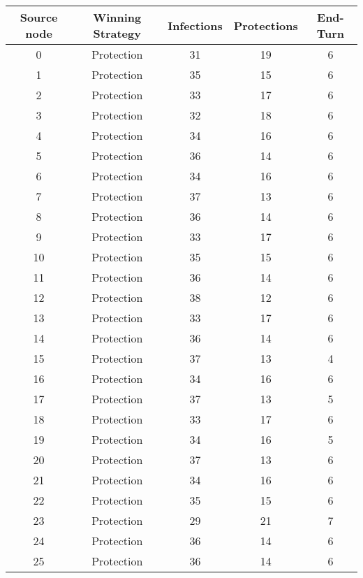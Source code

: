 \documentclass[results.tex]{subfiles}
\begin{document}
\begin{center}
  \begin{tabular}{| c || c | c | c | c |}
    \hline
    {\bfseries Source node} & {\bfseries Winning Strategy} & {\bfseries Infections} & {\bfseries Protections} & {\bfseries End-Turn} \\  %
    \hline\hline
    0 & Protection & 31 & 19 & 6 \\ 
    \hline
    1 & Protection & 35 & 15 & 6 \\ 
    \hline
    2 & Protection & 33 & 17 & 6 \\ 
    \hline
    3 & Protection & 32 & 18 & 6 \\ 
    \hline
    4 & Protection & 34 & 16 & 6 \\ 
    \hline
    5 & Protection & 36 & 14 & 6 \\ 
    \hline
    6 & Protection & 34 & 16 & 6 \\ 
    \hline
    7 & Protection & 37 & 13 & 6 \\ 
    \hline
    8 & Protection & 36 & 14 & 6 \\ 
    \hline
    9 & Protection & 33 & 17 & 6 \\ 
    \hline
    10 & Protection & 35 & 15 & 6 \\ 
    \hline
    11 & Protection & 36 & 14 & 6 \\ 
    \hline
    12 & Protection & 38 & 12 & 6 \\ 
    \hline
    13 & Protection & 33 & 17 & 6 \\ 
    \hline
    14 & Protection & 36 & 14 & 6 \\ 
    \hline
    15 & Protection & 37 & 13 & 4 \\ 
    \hline
    16 & Protection & 34 & 16 & 6 \\ 
    \hline
    17 & Protection & 37 & 13 & 5 \\ 
    \hline
    18 & Protection & 33 & 17 & 6 \\ 
    \hline
    19 & Protection & 34 & 16 & 5 \\ 
    \hline
    20 & Protection & 37 & 13 & 6 \\ 
    \hline
    21 & Protection & 34 & 16 & 6 \\ 
    \hline
    22 & Protection & 35 & 15 & 6 \\ 
    \hline
    23 & Protection & 29 & 21 & 7 \\ 
    \hline
    24 & Protection & 36 & 14 & 6 \\ 
    \hline
    25 & Protection & 36 & 14 & 6 \\ 

\end{tabular}
\end{center}
\end{document}
